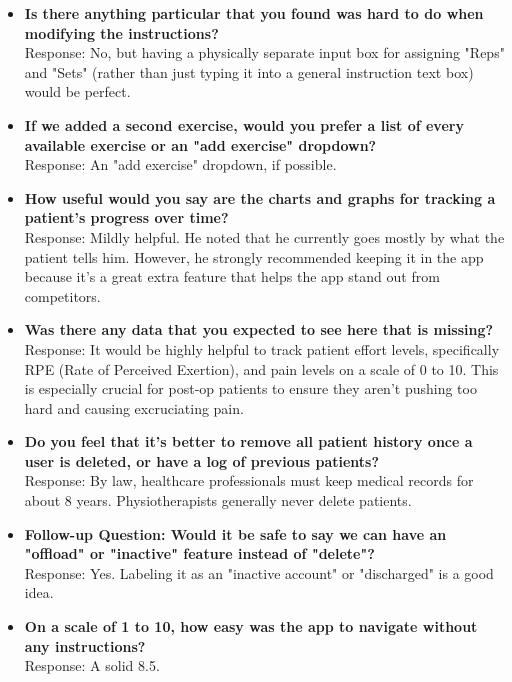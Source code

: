 \documentclass[12pt, titlepage]{article}
\begin{document}
\begin{itemize}
    \item \textbf{Is there anything particular that you found was hard to do when modifying the instructions?} \\
    Response: No, but having a physically separate input box for assigning "Reps" and "Sets" (rather than just typing it into a general instruction text box) would be perfect.

    \item \textbf{If we added a second exercise, would you prefer a list of every available exercise or an "add exercise" dropdown?} \\
    Response: An "add exercise" dropdown, if possible.

    \item \textbf{How useful would you say are the charts and graphs for tracking a patient's progress over time?} \\
    Response: Mildly helpful. He noted that he currently goes mostly by what the patient tells him. However, he strongly recommended keeping it in the app because it's a great extra feature that helps the app stand out from competitors.

    \item \textbf{Was there any data that you expected to see here that is missing?} \\
    Response: It would be highly helpful to track patient effort levels, specifically RPE (Rate of Perceived Exertion), and pain levels on a scale of 0 to 10. This is especially crucial for post-op patients to ensure they aren't pushing too hard and causing excruciating pain.

    \item \textbf{Do you feel that it's better to remove all patient history once a user is deleted, or have a log of previous patients?} \\
    Response: By law, healthcare professionals must keep medical records for about 8 years. Physiotherapists generally never delete patients.

    \item \textbf{Follow-up Question: Would it be safe to say we can have an "offload" or "inactive" feature instead of "delete"?} \\
    Response: Yes. Labeling it as an "inactive account" or "discharged" is a good idea.

    \item \textbf{On a scale of 1 to 10, how easy was the app to navigate without any instructions?} \\
    Response: A solid 8.5.


\end{itemize}
\end{document}
